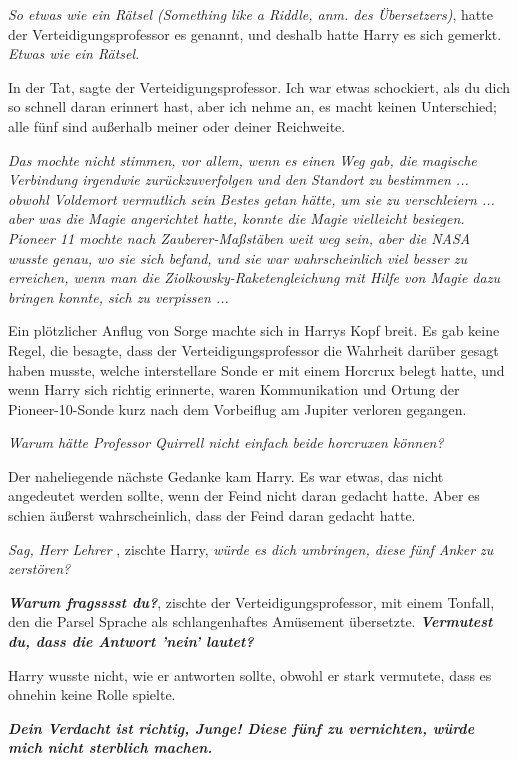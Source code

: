 \emph{So etwas wie ein Rätsel (\glqq{}Something like a Riddle\grqq{}, anm. des
Übersetzers)}, hatte der Verteidigungsprofessor es genannt, und deshalb hatte
Harry es sich gemerkt.
\emph{Etwas wie ein Rätsel.}

\glqq{}In der Tat\grqq{}, sagte der Verteidigungsprofessor. \glqq{}Ich war etwas
schockiert, als du dich so schnell daran erinnert hast, aber ich nehme an, es
macht keinen Unterschied; alle fünf sind außerhalb meiner oder deiner
Reichweite.\grqq{}

\emph{Das mochte nicht stimmen, vor allem, wenn es einen Weg gab, die magische
Verbindung irgendwie zurückzuverfolgen und den Standort zu bestimmen ... obwohl
Voldemort vermutlich sein Bestes getan hätte, um sie zu verschleiern ... aber
was die Magie angerichtet hatte, konnte die Magie vielleicht besiegen. Pioneer
11 mochte nach Zauberer-Maßstäben weit weg sein, aber die NASA wusste genau, wo
sie sich befand, und sie war wahrscheinlich viel besser zu erreichen, wenn man
die Ziolkowsky-Raketengleichung mit Hilfe von Magie dazu bringen konnte, sich zu
verpissen ...}

Ein plötzlicher Anflug von Sorge machte sich in Harrys Kopf breit. Es gab keine
Regel, die besagte, dass der Verteidigungsprofessor die Wahrheit darüber gesagt
haben musste, welche interstellare Sonde er mit einem Horcrux belegt hatte, und
wenn Harry sich richtig erinnerte, waren Kommunikation und Ortung der
Pioneer-10-Sonde kurz nach dem Vorbeiflug am Jupiter verloren gegangen.

\emph{Warum hätte Professor Quirrell nicht einfach beide horcruxen können?}

Der naheliegende nächste Gedanke kam Harry. Es war etwas, das nicht angedeutet
werden sollte, wenn der Feind nicht daran gedacht hatte. Aber es schien äußerst
wahrscheinlich, dass der Feind daran gedacht hatte.

\glqq{}\emph{Sag, Herr Lehrer\grqq{}} , zischte Harry, \glqq{}\emph{würde es dich
umbringen, diese fünf Anker zu zerstören?}\grqq{}

\glqq{}\textbf{\emph{Warum fragsssst du?}}\grqq{}, zischte der
Verteidigungsprofessor, mit einem Tonfall, den die Parsel Sprache als
schlangenhaftes Amüsement übersetzte. \glqq{}\textbf{\emph{Vermutest du, dass die
Antwort 'nein' lautet?}}\grqq{}

Harry wusste nicht, wie er antworten sollte, obwohl er stark vermutete, dass es
ohnehin keine Rolle spielte.

\glqq{}\textbf{\emph{Dein Verdacht ist richtig, Junge! Diese fünf zu vernichten,
würde mich nicht sterblich machen.}}\grqq{}

